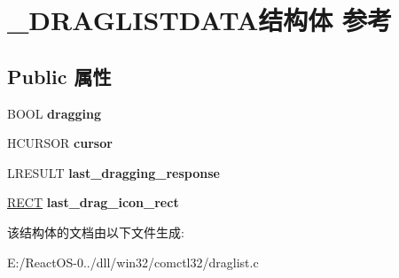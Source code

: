 \hypertarget{struct___d_r_a_g_l_i_s_t_d_a_t_a}{}\section{\+\_\+\+D\+R\+A\+G\+L\+I\+S\+T\+D\+A\+T\+A结构体 参考}
\label{struct___d_r_a_g_l_i_s_t_d_a_t_a}
\subsection*{Public 属性}
\begin{DoxyCompactItemize}
\item 
\mbox{\label{struct___d_r_a_g_l_i_s_t_d_a_t_a_a5882beb4f1be736d6ac59ee80997c8a7}} 
B\+O\+OL {\bfseries dragging}
\item 
\mbox{\label{struct___d_r_a_g_l_i_s_t_d_a_t_a_ab98ebac73ae993f7effd40d30bc2986c}} 
H\+C\+U\+R\+S\+OR {\bfseries cursor}
\item 
\mbox{\label{struct___d_r_a_g_l_i_s_t_d_a_t_a_a65157180c42c352cd5f1e7f15a06d18f}} 
L\+R\+E\+S\+U\+LT {\bfseries last\+\_\+dragging\+\_\+response}
\item 
\mbox{\label{struct___d_r_a_g_l_i_s_t_d_a_t_a_a40ea80c52be933f15d487aa2fabcd7c1}} 
\hyperlink{structtag_r_e_c_t}{R\+E\+CT} {\bfseries last\+\_\+drag\+\_\+icon\+\_\+rect}
\end{DoxyCompactItemize}


该结构体的文档由以下文件生成\+:\begin{DoxyCompactItemize}
\item 
E\+:/\+React\+O\+S-\/0../dll/win32/comctl32/draglist.\+c\end{DoxyCompactItemize}
